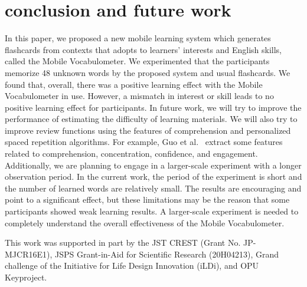 \documentclass[sigchi]{acmart}
\begin{document}
\section{conclusion and future work}
In this paper, we proposed a new mobile learning system which generates flashcards from contexts that adopts to learners' interests and English skills, called the Mobile Vocabulometer. We experimented that the participants memorize 48 unknown words by the proposed system and usual flashcards. We found that, overall, there was a positive learning effect with the Mobile Vocabulometer in use. However, a mismatch in interest or skill leads to no positive learning effect for participants. In future work, we will try to improve the performance of estimating the difficulty of learning materials. We will also try to improve review functions using the features of comprehension and personalized spaced repetition algorithms. For example, Guo et al.~\cite{guo2018understanding} extract some features related to comprehension, concentration, confidence, and engagement. Additionally, we are planning to engage in a larger-scale experiment with a longer observation period. In the current work, the period of the experiment is short and the number of learned words are relatively small. The results are encouraging and point to a significant effect, but these limitations may be the reason that some participants showed weak learning results. A larger-scale experiment is needed to completely understand the overall effectiveness of the Mobile Vocabulometer.


\begin{acks}
This work was supported in part by the JST CREST (Grant No. JP-MJCR16E1), JSPS Grant-in-Aid for Scientific Research (20H04213), Grand challenge of the Initiative for Life Design Innovation (iLDi), and OPU Keyproject.
\end{acks}


\end{document}
